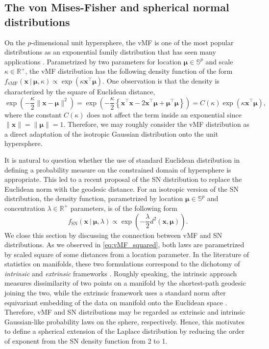 \documentclass[10pt]{article}
\newcommand{\bfx}{\mathbf{x}}
\newcommand{\bfmu}{\boldsymbol{\mu}}
\newcommand{\bbS}{\mathbb{S}}
\newcommand{\bbRpos}{\mathbb{R}^+}
\newcommand{\fvMF}{f_{\textrm{vMF}}}
\newcommand{\fSN}{f_{\textrm{SN}}}
\begin{document}
\subsection{The von Mises-Fisher and spherical normal distributions}

On the $p$-dimensional unit hypersphere, the vMF is one of the most popular distributions as an exponential family distribution that has seen many applications  \cite{banerjee_2005_ClusteringUnitHypersphere, bhattacharya_2012_NonparametricBayesClassification, gopal_2014_MisesfisherClusteringModels}. Parametrized by two parameters for  location $\bfmu \in \bbS^p$ and scale $\kappa \in \bbRpos$, the vMF distribution has the following density function of the form $\fvMF (\bfx~|~ \boldsymbol{\mu}, \kappa) \propto \exp (\kappa \bfx^\top \bfmu)$. One observation is that the density is characterized by the square of Euclidean distance,
\begin{equation}\label{eq:vMF_squared}
\exp \left( -\frac{\kappa}{2} \|\bfx - \bfmu\|^2 \right) = \exp \left( -\frac{\kappa}{2} \left\lbrace \bfx^\top \bfx  - 2\bfx^\top \bfmu + \bfmu^\top \bfmu \right\rbrace \right) = C(\kappa) \exp (\kappa \bfx^\top \bfmu),
\end{equation}
where the constant $C(\kappa)$ does not affect the term inside an exponential since $\|\bfx\|=\|\bfmu\|=1$. Therefore, we may roughly consider the vMF distribution as a direct adaptation of the isotropic Gaussian distribution onto the unit hypersphere. 


It is natural to question whether the use of standard Euclidean distribution in defining a probability measure on the constrained domain of hypersphere is appropriate. This led to a recent proposal of the SN distribution to replace the Euclidean norm with the geodesic distance. For an isotropic version of the SN distribution, the density function, parametrized by
location $\bfmu \in \bbS^p$ and concentration $\lambda \in \bbRpos$ parameters, is of the following form
\begin{equation}
\fSN (\bfx~|~\bfmu,\lambda) \propto \exp \left(-\frac{\lambda}{2} d^2 (\bfx, \bfmu)\right).
\end{equation}
We close this section by discussing the connection between vMF and SN distributions. As we observed in \eqref{eq:vMF_squared}, both laws are parametrized by scaled square of some distances from a location parameter. In the literature of statistics on manifolds, these two formulations correspond to the dichotomy of \textit{intrinsic} and \textit{extrinsic} frameworks \cite{bhattacharya_2012_NonparametricInferenceManifolds}. Roughly speaking, the intrinsic approach measures dissimilarity of two points on a manifold by the shortest-path geodesic joining the two, while the extrinsic framework uses a standard norm after equivariant embedding of the data on manifold onto the Euclidean space \cite{wasserman_1969_EquivariantDifferentialTopology}. Therefore, vMF and SN distributions may be regarded as extrinsic and intrinsic Gaussian-like probability laws on the sphere, respectively. Hence, this motivates to define a spherical extension of the Laplace distribution by reducing the order of exponent from the SN density function from 2 to 1. 
\end{document}
